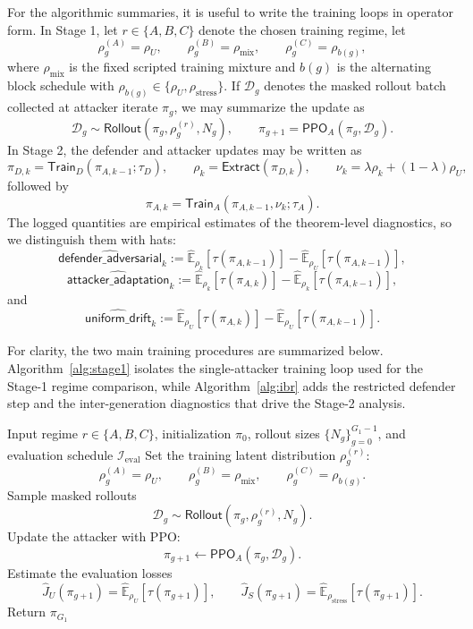 \documentclass[11pt]{article}
\newcommand{\E}{\mathbb{E}}
\newcommand{\tauT}{\tau}
\newcommand{\rhoStress}{\rho_{\mathrm{stress}}}
\begin{document}
For the algorithmic summaries, it is useful to write the training loops in operator form. In Stage 1, let $r\in\{A,B,C\}$ denote the chosen training regime, let
\[
\rho^{(A)}_g=\rho_U,
\qquad
\rho^{(B)}_g=\rho_{\mathrm{mix}},
\qquad
\rho^{(C)}_g=\rho_{b(g)},
\]
where $\rho_{\mathrm{mix}}$ is the fixed scripted training mixture and $b(g)$ is the alternating block schedule with $\rho_{b(g)}\in\{\rho_U,\rhoStress\}$. If $\mathcal{D}_g$ denotes the masked rollout batch collected at attacker iterate $\pi_g$, we may summarize the update as
\[
\mathcal{D}_g \sim \mathsf{Rollout}(\pi_g,\rho^{(r)}_g,N_g),
\qquad
\pi_{g+1}=\mathsf{PPO}_{A}(\pi_g,\mathcal{D}_g).
\]
In Stage 2, the defender and attacker updates may be written as
\[
\pi_{D,k}=\mathsf{Train}_{D}(\pi_{A,k-1};\tau_D),
\qquad
\rho_k=\mathsf{Extract}(\pi_{D,k}),
\qquad
\nu_k=\lambda \rho_k+(1-\lambda)\rho_U,
\]
followed by
\[
\pi_{A,k}=\mathsf{Train}_{A}(\pi_{A,k-1},\nu_k;\tau_A).
\]
The logged quantities are empirical estimates of the theorem-level diagnostics, so we distinguish them with hats:
\[
\widehat{\textsf{defender\_adversarial}}_k
:=
\widehat{\E}_{\rho_k}[\tauT(\pi_{A,k-1})]
-
\widehat{\E}_{\rho_U}[\tauT(\pi_{A,k-1})],
\]
\[
\widehat{\textsf{attacker\_adaptation}}_k
:=
\widehat{\E}_{\rho_k}[\tauT(\pi_{A,k})]
-
\widehat{\E}_{\rho_k}[\tauT(\pi_{A,k-1})],
\]
and
\[
\widehat{\textsf{uniform\_drift}}_k
:=
\widehat{\E}_{\rho_U}[\tauT(\pi_{A,k})]
-
\widehat{\E}_{\rho_U}[\tauT(\pi_{A,k-1})].
\]

For clarity, the two main training procedures are summarized below. Algorithm~\ref{alg:stage1} isolates the single-attacker training loop used for the Stage-1 regime comparison, while Algorithm~\ref{alg:ibr} adds the restricted defender step and the inter-generation diagnostics that drive the Stage-2 analysis.

\begin{algorithm}[H]
\caption{Stage-1 attacker training}
\label{alg:stage1}
\begin{algorithmic}[1]
\STATE Input regime $r\in\{A,B,C\}$, initialization $\pi_0$, rollout sizes $\{N_g\}_{g=0}^{G_1-1}$, and evaluation schedule $\mathcal{I}_{\mathrm{eval}}$
    \STATE Set the training latent distribution $\rho^{(r)}_g$:
    \[
    \rho^{(A)}_g=\rho_U,\qquad
    \rho^{(B)}_g=\rho_{\mathrm{mix}},\qquad
    \rho^{(C)}_g=\rho_{b(g)}.
    \]
    \STATE Sample masked rollouts
    \[
    \mathcal{D}_g \sim \mathsf{Rollout}(\pi_g,\rho^{(r)}_g,N_g).
    \]
    \STATE Update the attacker with PPO:
    \[
    \pi_{g+1}\leftarrow \mathsf{PPO}_{A}(\pi_g,\mathcal{D}_g).
    \]
        \STATE Estimate the evaluation losses
        \[
        \widehat{J}_U(\pi_{g+1})=\widehat{\E}_{\rho_U}[\tauT(\pi_{g+1})],
        \qquad
        \widehat{J}_S(\pi_{g+1})=\widehat{\E}_{\rhoStress}[\tauT(\pi_{g+1})].
        \]
    \ENDIF
\ENDFOR
\STATE Return $\pi_{G_1}$
\end{algorithmic}
\end{algorithm}
\end{document}
